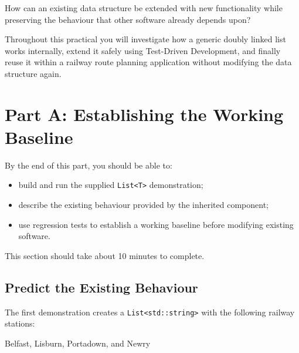 \documentclass{csc2059practical}
\begin{document}
\begin{engineeringquestion}

How can an existing data structure be extended with new functionality while preserving the behaviour that other software already depends upon?

Throughout this practical you will investigate how a generic doubly linked list works internally, extend it safely using Test-Driven Development, and finally reuse it within a railway route planning application without modifying the data structure again.
\end{engineeringquestion}



\section{Part A: Establishing the Working Baseline}

\begin{learningoutcomes}
By the end of this part, you should be able to:

\begin{itemize}
    \item build and run the supplied \texttt{List<T>} demonstration;
    \item describe the existing behaviour provided by the inherited component;
    \item use regression tests to establish a working baseline before modifying existing software.
\end{itemize}
\end{learningoutcomes}

\begin{infobox}
This section should take about 10 minutes to complete.
\end{infobox}

\subsection{Predict the Existing Behaviour}

The first demonstration creates a \texttt{List<std::string>} with the following railway stations:

\begin{center}
Belfast, Lisburn, Portadown, and Newry
\end{center}
\end{document}
